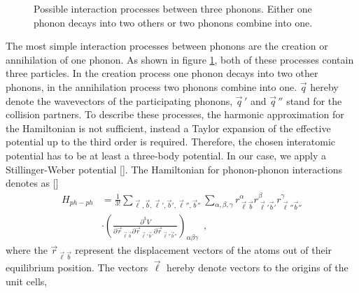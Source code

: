 \documentclass[ aps, prb, reprint, groupedaddress]{revtex4-1}
\makeatletter
\newcommand{\citen}[1]{\def\NAT@spacechar{}[\citenum{#1}]}
\makeatother
\begin{document}
\begin{figure}
\centering
{}
\caption{Possible interaction processes between three phonons. Either one phonon decays into two others or two phonons combine into one.}
\label{abb:phphcoll}
\end{figure}
The most simple interaction processes between phonons are the creation or annihilation of one phonon. As shown in figure \ref{abb:phphcoll},
both of these processes contain three particles. In the creation process one phonon decays into two other phonons,
in the annihilation process two phonons combine into one. $\vec q$ hereby denote the wavevectors of the participating phonons, $\vec q \,'$ and $\vec q \,''$ stand for the collision partners.
To describe these processes, the harmonic approximation for the Hamiltonian is not sufficient, instead a Taylor expansion of the effective
potential up to the third order is required. Therefore, the chosen interatomic potential has to be at least a three-body potential. In our case, we apply a Stillinger-Weber potential \citen{Stillinger85}.
The Hamiltonian for phonon-phonon interactions denotes as \citen{ZimanElPhon}
\begin{align}
H_{ph-ph}&= \frac{1}{3!} \sum_{\vec{\ell}, \vec b,\vec{\ell}',\vec b',\vec{\ell}'',\vec b''} \sum_{\alpha , \beta , \gamma} r_{\vec{\ell} \vec b}^{\alpha} r_{\vec{\ell}'\vec b'}^{\beta} r_{\vec{\ell}''\vec b''}^{\gamma} 
\nonumber \\& \cdot \left(\frac{\partial^3 V}{\partial \vec r_{\vec{\ell} \vec b} \partial \vec r_{\vec{\ell}'\vec b'} \partial \vec r_{\vec{\ell}'' \vec b''}}\right)_{ \alpha \beta \gamma}  \enspace ,
\end{align}
where the $\vec r_{\vec{\ell}\vec b}$ represent the displacement vectors of the atoms out of their equilibrium position. The vectors $\vec{\ell}$ hereby denote vectors to the origins of the unit cells, 
\end{document}
